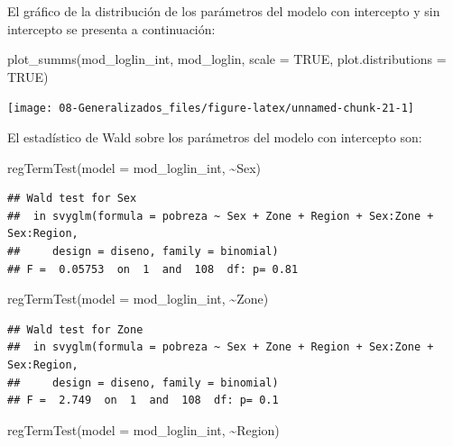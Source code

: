 \documentclass[
  12pt,
]{book}
\newenvironment{Shaded}{\begin{snugshade}}{\end{snugshade}}
\newcommand{\AttributeTok}[1]{\textcolor[rgb]{0.77,0.63,0.00}{#1}}
\newcommand{\ConstantTok}[1]{\textcolor[rgb]{0.00,0.00,0.00}{#1}}
\newcommand{\FunctionTok}[1]{\textcolor[rgb]{0.00,0.00,0.00}{#1}}
\newcommand{\NormalTok}[1]{#1}
\newcommand{\SpecialCharTok}[1]{\textcolor[rgb]{0.00,0.00,0.00}{#1}}
\begin{document}
El gráfico de la distribución de los parámetros del modelo con intercepto y sin intercepto se presenta a continuación:

\begin{Shaded}
\begin{Highlighting}[]
\FunctionTok{plot\_summs}\NormalTok{(mod\_loglin\_int, mod\_loglin, }\AttributeTok{scale =} \ConstantTok{TRUE}\NormalTok{, }\AttributeTok{plot.distributions =} \ConstantTok{TRUE}\NormalTok{)}
\end{Highlighting}
\end{Shaded}

\texttt{[image: 08-Generalizados\_files/figure-latex/unnamed-chunk-21-1]}

El estadístico de Wald sobre los parámetros del modelo con intercepto son:

\begin{Shaded}
\begin{Highlighting}[]
  \FunctionTok{regTermTest}\NormalTok{(}\AttributeTok{model =}\NormalTok{ mod\_loglin\_int, }\SpecialCharTok{\textasciitilde{}}\NormalTok{Sex)}
\end{Highlighting}
\end{Shaded}

\begin{verbatim}
## Wald test for Sex
##  in svyglm(formula = pobreza ~ Sex + Zone + Region + Sex:Zone + Sex:Region, 
##     design = diseno, family = binomial)
## F =  0.05753  on  1  and  108  df: p= 0.81
\end{verbatim}

\begin{Shaded}
\begin{Highlighting}[]
  \FunctionTok{regTermTest}\NormalTok{(}\AttributeTok{model =}\NormalTok{ mod\_loglin\_int, }\SpecialCharTok{\textasciitilde{}}\NormalTok{Zone)}
\end{Highlighting}
\end{Shaded}

\begin{verbatim}
## Wald test for Zone
##  in svyglm(formula = pobreza ~ Sex + Zone + Region + Sex:Zone + Sex:Region, 
##     design = diseno, family = binomial)
## F =  2.749  on  1  and  108  df: p= 0.1
\end{verbatim}

\begin{Shaded}
\begin{Highlighting}[]
  \FunctionTok{regTermTest}\NormalTok{(}\AttributeTok{model =}\NormalTok{ mod\_loglin\_int, }\SpecialCharTok{\textasciitilde{}}\NormalTok{Region)}
\end{Highlighting}
\end{Shaded}
\end{document}

